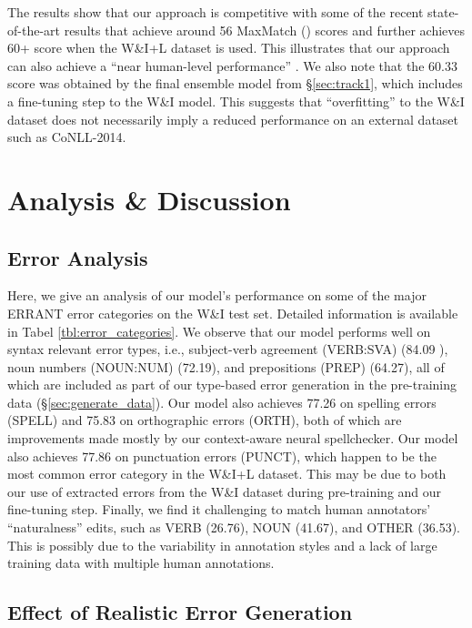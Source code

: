 \documentclass[11pt,a4paper]{article}
\begin{document}
The results show that our approach is competitive with some of the recent state-of-the-art results that achieve around 56 MaxMatch () scores and further achieves 60+  score when the W\&I+L dataset is used. 
This illustrates that our approach can also achieve a ``near human-level performance'' \cite{grundkiewicz2018near}.
We also note that the 60.33  score was obtained by the final ensemble model from \S\ref{sec:track1}, which includes a fine-tuning step to the W\&I model. 
This suggests that ``overfitting'' to the W\&I dataset does not necessarily imply a reduced performance on an external dataset such as CoNLL-2014.



\section{Analysis \& Discussion} 

\subsection{Error Analysis}

Here, we give an analysis of our model's performance on some of the major ERRANT error categories on the W\&I test set. Detailed information is available in Tabel \ref{tbl:error_categories}.
We observe that our model performs well on syntax relevant error types, i.e., subject-verb agreement (VERB:SVA) (84.09 ), noun numbers (NOUN:NUM) (72.19), and prepositions (PREP) (64.27), all of which are included as part of our type-based error generation in the pre-training data (\S\ref{sec:generate_data}). 
Our model also achieves 77.26 on spelling errors (SPELL) and 75.83 on orthographic errors (ORTH), both of which are improvements made mostly by our context-aware neural spellchecker. 
Our model also achieves 77.86 on punctuation errors (PUNCT), which happen to be the most common error category in the W\&I+L dataset.
This may be due to both our use of extracted errors from the W\&I dataset during pre-training and our fine-tuning step. 
Finally, we find it challenging to match human annotators' ``naturalness'' edits, such as VERB (26.76), NOUN (41.67), and OTHER (36.53). 
This is possibly due to the variability in annotation styles and a lack of large training data with multiple human annotations.


\subsection{Effect of Realistic Error Generation}\label{sec:realistic}
\end{document}
